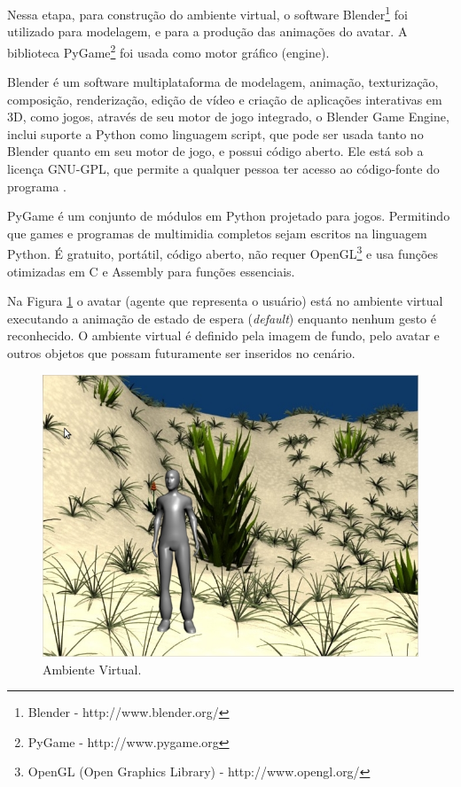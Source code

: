 
 Nessa etapa, para construção do ambiente virtual, o software Blender\footnote{Blender - http://www.blender.org/} foi utilizado para modelagem, e para a produção das animações do avatar. A biblioteca PyGame\footnote{PyGame - http://www.pygame.org} foi usada como motor gráfico (engine).

Blender é um software multiplataforma de modelagem, animação, texturização, composição, renderização,
edição de vídeo e criação de aplicações interativas em 3D, como jogos, através de seu
motor de jogo integrado, o Blender Game Engine, inclui suporte a Python como linguagem
script, que pode ser usada tanto no Blender quanto em seu motor de jogo, e possui código aberto.
Ele está sob a licença GNU-GPL, que permite a qualquer pessoa ter acesso ao código-fonte do programa \cite{Blender3D}.

PyGame é um conjunto de módulos em Python projetado para jogos. Permitindo que games e programas de multimidia completos sejam escritos na linguagem Python. É gratuito, portátil, código aberto, não requer OpenGL\footnote{OpenGL (Open Graphics Library) - http://www.opengl.org/} e usa funções otimizadas em C e Assembly para funções essenciais.

Na Figura \ref{img:ambiente_virtual} o avatar (agente que representa o usuário) está no ambiente virtual executando a animação de estado de espera (\textit{default}) enquanto nenhum gesto é reconhecido. O ambiente virtual é definido pela imagem de fundo, pelo avatar e outros objetos que possam futuramente ser inseridos no cenário.

\begin{figure}[!htbp]
  \center
  \includegraphics[scale=0.40]{imagens/ambiente_virtual.jpg}
  \caption{Ambiente Virtual.}
  \label{img:ambiente_virtual}
\end{figure}



